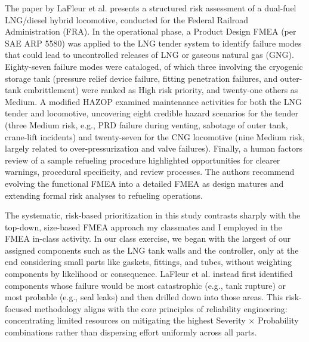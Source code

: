 

%
%

\newcommand{\hmwkTitle}{Homework 07}
\newcommand{\hmwkSubTitle}{FMEA}
\newcommand{\hmwkDueDate}{April 28, 2025}
\newcommand{\hmwkDueTime}{03:30 PM}
\newcommand{\hmwkClass}{ENRE 447 - 0101}
\newcommand{\hmwkClassTime}{03:30 PM}
\newcommand{\hmwkClassInstructor}{Dr. Groth}
\newcommand{\hmwkAuthorName}{\textbf{Vai Srivastava}}
\newcommand{\hmwkCompletionDate}{\today}



\begin{hwkProblem}{5}{}

The paper by LaFleur et al. presents a structured risk assessment of a dual-fuel LNG/diesel hybrid locomotive, conducted for the Federal Railroad Administration (FRA). In the operational phase, a Product Design FMEA (per SAE ARP 5580) was applied to the LNG tender system to identify failure modes that could lead to uncontrolled releases of LNG or gaseous natural gas (GNG). Eighty-seven failure modes were cataloged, of which three involving the cryogenic storage tank (pressure relief device failure, fitting penetration failures, and outer-tank embrittlement) were ranked as High risk priority, and twenty-one others as Medium. A modified HAZOP examined maintenance activities for both the LNG tender and locomotive, uncovering eight credible hazard scenarios for the tender (three Medium risk, e.g., PRD failure during venting, sabotage of outer tank, crane-lift incidents) and twenty-seven for the CNG locomotive (nine Medium risk, largely related to over-pressurization and valve failures). Finally, a human factors review of a sample refueling procedure highlighted opportunities for clearer warnings, procedural specificity, and review processes. The authors recommend evolving the functional FMEA into a detailed FMEA as design matures and extending formal risk analyses to refueling operations.

The systematic, risk-based prioritization in this study contrasts sharply with the top-down, size-based FMEA approach my classmates and I employed in the FMEA in-class activity. In our class exercise, we began with the largest of our assigned components such as the LNG tank walls and the controller, only at the end considering small parts like gaskets, fittings, and tubes, without weighting components by likelihood or consequence. LaFleur et al. instead first identified components whose failure would be most catastrophic (e.g., tank rupture) or most probable (e.g., seal leaks) and then drilled down into those areas. This risk-focused methodology aligns with the core principles of reliability engineering: concentrating limited resources on mitigating the highest Severity × Probability combinations rather than dispersing effort uniformly across all parts.


\end{hwkProblem}
